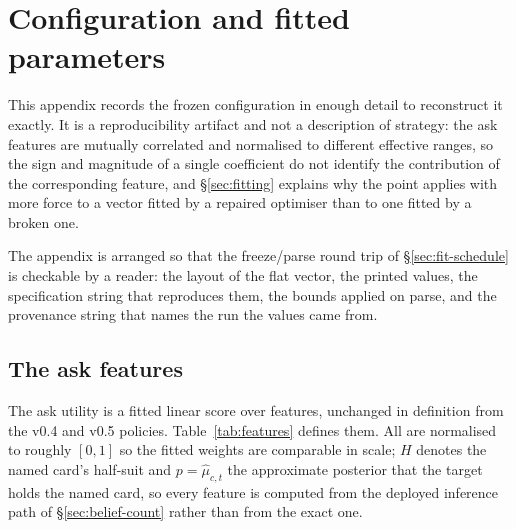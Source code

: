 \section{Configuration and fitted parameters}
\label{app:params}

This appendix records the frozen configuration in enough detail to reconstruct it
exactly. It is a reproducibility artifact and not a description of strategy: the
ask features are mutually correlated and normalised to different effective
ranges, so the sign and magnitude of a single coefficient do not identify the
contribution of the corresponding feature, and \S\ref{sec:fitting} explains why
the point applies with more force to a vector fitted by a repaired optimiser than
to one fitted by a broken one.

The appendix is arranged so that the freeze/parse round trip of
\S\ref{sec:fit-schedule} is checkable by a reader: the layout of the flat vector,
the printed values, the specification string that reproduces them, the bounds
applied on parse, and the provenance string that names the run the values came
from.

\subsection{The ask features}
\label{app:params-features}

The ask utility is a fitted linear score over \numAskFeats{} features, unchanged
in definition from the v0.4 and v0.5 policies. Table~\ref{tab:features} defines
them. All are normalised to roughly $[0,1]$ so the fitted weights are comparable
in scale; $H$ denotes the named card's half-suit and $p = \hat\mu_{c,t}$ the
approximate posterior that the target holds the named card, so every feature is
computed from the deployed inference path of \S\ref{sec:belief-count} rather than
from the exact one.

